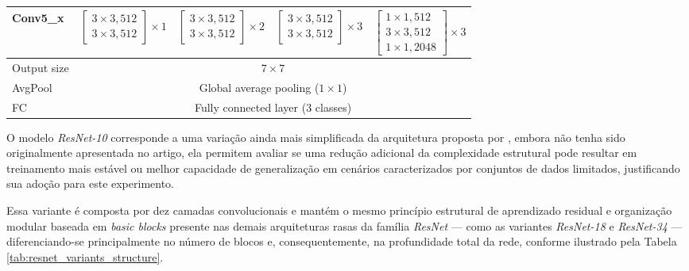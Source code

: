 \begin{table}[h]
{\begin{tabular}{l|c|c|c|c}
		Conv5\_x 
		& $\left[\begin{array}{l} 3\times3, 512 \\ 3\times3, 512 \end{array}\right] \times 1$
		& $\left[\begin{array}{l} 3\times3, 512 \\ 3\times3, 512 \end{array}\right] \times 2$
		& $\left[\begin{array}{l} 3\times3, 512 \\ 3\times3, 512 \end{array}\right] \times 3$
		& $\left[\begin{array}{l} 1\times1, 512 \\ 3\times3, 512 \\ 1\times1, 2048 \end{array}\right] \times 3$ \\
		
		\hline
		
		Output size 
		& \multicolumn{4}{c}{$7 \times 7$} \\
		
		\hline
		
		AvgPool 
		& \multicolumn{4}{c}{Global average pooling ($1 \times 1$)} \\
		
		FC 
		& \multicolumn{4}{c}{Fully connected layer (3 classes)} \\
		
		\bottomrule
	\end{tabular}
	}
	
\end{table}

O modelo \textit{ResNet-10} corresponde a uma variação ainda mais simplificada da arquitetura proposta por \cite{he2016}, embora não tenha sido originalmente apresentada no artigo, ela permitem avaliar se uma redução adicional da complexidade estrutural pode resultar em treinamento mais estável ou melhor capacidade de generalização em cenários caracterizados por conjuntos de dados limitados, justificando sua adoção para este experimento.
 
Essa variante é composta por dez camadas convolucionais e mantém o mesmo princípio estrutural de aprendizado residual e organização modular baseada em \textit{basic blocks} presente nas demais arquiteturas rasas da família \textit{ResNet} — como as variantes \textit{ResNet-18} e \textit{ResNet-34} — diferenciando-se principalmente no número de blocos e, consequentemente, na profundidade total da rede, conforme ilustrado pela Tabela \ref{tab:resnet_variants_structure}.

